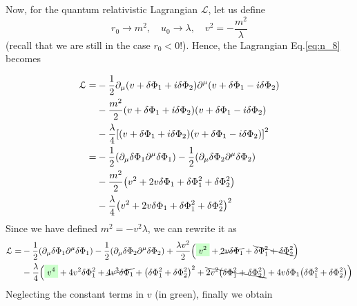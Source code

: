 \documentclass[../../Main/Main.tex]{subfiles}
\begin{document}
Now, for the quantum relativistic Lagrangian \( \mathcal{L} \), let us define
\begin{equation*}
  r_0 \rightarrow m^2, \quad u_0 \rightarrow \lambda , \quad v^2 = - \frac{m^2}{\lambda }
\end{equation*}
(recall that we are still in the case \( r_0<0 \)!).
Hence, the Lagrangian Eq.\eqref{eq:n_8} becomes

\begin{equation*}
\begin{split}
\mathcal{L}  = & - \frac{1}{2} \partial _ \mu \qty(v+\delta \Phi _1 + i \delta \Phi _2)   \partial ^\mu \qty(v+\delta \Phi _1 - i \delta \Phi _2)  \\
 & - \frac{m^2}{2} \qty(v + \delta \Phi _1 + i \delta \Phi _2) \qty(v + \delta \Phi _1 - i \delta \Phi _2) \\
 & - \frac{\lambda }{4} \qty[ \qty(v + \delta \Phi _1 + i \delta \Phi _2) \qty(v + \delta \Phi _1 - i \delta \Phi _2) ] ^2 \\
 =& - \frac{1}{2} \qty(\partial_ \mu  \delta \Phi _1 \partial^ \mu \delta \Phi _1  )
 - \frac{1}{2} \qty( \partial_ \mu  \delta \Phi _2 \partial^\mu \delta \Phi _2  )  \\
 & - \frac{m^2}{2} \qty(v^2 + 2 v \delta \Phi _1 + \delta \Phi _1^2 + \delta \Phi _2^2) \\
 &- \frac{\lambda }{4} \qty(v^2 + 2 v \delta \Phi _1 + \delta \Phi _1^2 + \delta \Phi _2 ^2)^2
\end{split}
\end{equation*}
Since we have defined \( m^2 = - v^2 \lambda  \), we can rewrite it as
\begin{equation*}
\begin{split}
\mathcal{L}   = &  - \frac{1}{2} \qty(\partial_ \mu  \delta \Phi _1 \partial^ \mu \delta \Phi _1  )
- \frac{1}{2} \qty( \partial_ \mu  \delta \Phi _2 \partial^ \mu \delta \Phi _2  )
 + \frac{\lambda v^2}{2} \qty( \mathcolorbox{green!20}{v^2} + \cancel{2 v \delta \Phi _1}  +  \bcancel{\delta \Phi _1^2 + \delta \Phi _2^2})  \\
& - \frac{\lambda }{4} \qty( \mathcolorbox{green!20}{v^4} + 4 v^2 \delta \Phi _1^2
  +   \cancel{4 v^3 \delta \Phi _1}  +  \qty(\delta \Phi _1^2 + \delta \Phi _2^2)^2 + \bcancel{2 v^2 \qty(\delta \Phi _1^2 + \delta \Phi _2^2)} + 4 v \delta \Phi _1 \qty(\delta \Phi _1^2 + \delta \Phi _2^2)   )
\end{split}
\end{equation*}
Neglecting the constant terms in \( v \) (in green), finally we obtain
\end{document}
